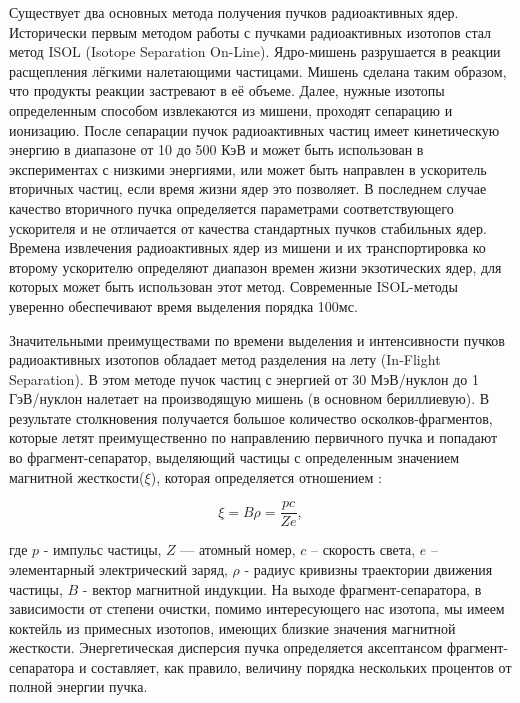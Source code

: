 Существует два основных метода получения пучков радиоактивных ядер.
Исторически первым методом работы с пучками радиоактивных изотопов стал метод ISOL (Isotope Separation On-Line)\cite{ufn}. Ядро-мишень разрушается в реакции расщепления лёгкими налетающими частицами. Мишень сделана таким образом, что продукты реакции застревают в её объеме. Далее, нужные изотопы определенным способом извлекаются из мишени, проходят сепарацию и ионизацию. После сепарации пучок радиоактивных частиц имеет кинетическую энергию в диапазоне от 10 до 500 КэВ и может быть использован в экспериментах с низкими энергиями, или может быть направлен в ускоритель вторичных частиц, если время жизни ядер это позволяет. В последнем случае качество вторичного пучка определяется параметрами соответствующего ускорителя и не отличается от качества стандартных пучков стабильных ядер. Времена извлечения радиоактивных ядер из мишени и их транспортировка ко второму ускорителю определяют диапазон времен жизни экзотических ядер, для которых может быть использован этот метод. Современные ISOL-методы уверенно обеспечивают время выделения порядка 100мс\cite{ufn}. 

Значительными преимуществами по времени выделения и интенсивности пучков радиоактивных изотопов обладает метод разделения на лету (In-Flight Separation). В этом методе пучок частиц с энергией от 30 МэВ/нуклон до 1 ГэВ/нуклон налетает на производящую мишень (в основном бериллиевую). В результате столкновения получается большое количество осколков-фрагментов, которые летят преимущественно по направлению первичного пучка и попадают во фрагмент-сепаратор, выделяющий частицы с определенным значением магнитной жесткости($\xi$), которая определяется отношением :

\begin{equation}
\label{Mag}
\xi = B \rho =  \frac{pc}{Ze},
\end{equation}

где $p$ - импульс частицы, $Z$ — атомный номер, $c$ – скорость света, $e$ – элементарный электрический заряд, $\rho$ - радиус кривизны траектории движения частицы, $B$ - вектор магнитной индукции.  На выходе фрагмент-сепаратора, в зависимости от степени очистки, помимо интересующего нас изотопа, мы имеем коктейль из примесных изотопов, имеющих близкие значения магнитной жесткости. Энергетическая дисперсия пучка определяется аксептансом фрагмент-сепаратора и составляет, как правило, величину порядка нескольких процентов от полной энергии пучка. 



